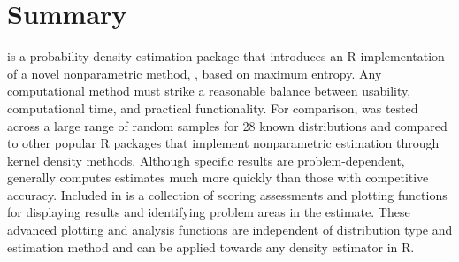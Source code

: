 \section{Summary} \label{sec:summary}

 is a probability density estimation package that introduces an R implementation of a novel nonparametric method, , based on maximum entropy. Any computational method must strike a reasonable balance between usability, computational time, and practical functionality. For comparison,  was tested across a large range of random samples for 28 known distributions and compared to other popular R packages that implement nonparametric estimation through kernel density methods. Although specific results are problem-dependent,  generally computes estimates much more quickly than those with competitive accuracy. Included in  is a collection of scoring assessments and plotting functions for displaying results and identifying problem areas in the estimate. These advanced plotting and analysis functions are independent of distribution type and estimation method and can be applied towards any density estimator in R. 



\address{Jenny Farmer\\
  Department of Bioinformatics\\
  University of North Carolina at Charlotte\\
  Charlotte, NC \\
  United States of America\\
  ORCiD 0000-0002-7953-1044\\
  }

\address{Donald Jacobs\\
  Department of Physics and Optical Science\\
  University of North Carolina at Charlotte\\
  Charlotte, NC \\
  United States of America\\
  ORCiD 0000-0001-7711-1639\\
  }


